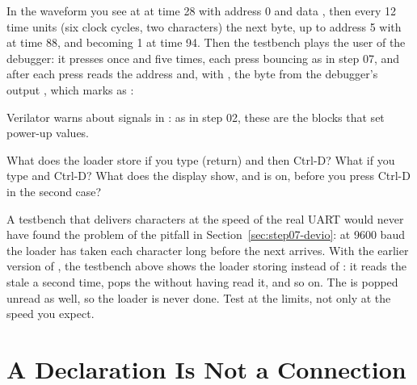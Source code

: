 In the waveform you see  at  at time 28 with
address 0 and data , then every 12 time units (six clock cycles,
two characters) the next byte, up to address 5 with  at time 88,
and  becoming 1 at time 94. Then the testbench plays the user of
the debugger: it presses  once and  five times, each press
bouncing as in step 07, and after each press reads the address and, with
, the byte from the debugger's output , which
 marks as :


Verilator warns about  signals in : as in
step 02, these are the  blocks that set power-up values.

\begin{exercise}
\label{ex:step08-loader}
What does the loader store if you type  (return)  and then
Ctrl-D? What if you type  and Ctrl-D? What does the display show, and
is  on, before you press Ctrl-D in the second case?
\end{exercise}

\begin{pitfall}
A testbench that delivers characters at the speed of the real UART would
never have found the problem of the pitfall in Section~\ref{sec:step07-devio}:
at 9600 baud the loader has taken each character long before the next
arrives. With the earlier version of , the testbench above shows
the loader storing  instead of :
it reads the stale  a second time, pops the  without having
read it, and so on. The  is popped unread as well, so the loader is
never done. Test at the limits, not only at the speed you expect.
\end{pitfall}

\section{A Declaration Is Not a Connection}
\label{sec:step08-rst}

